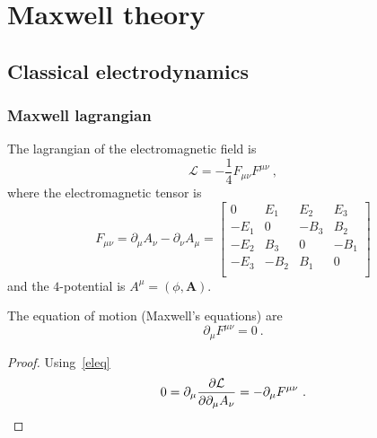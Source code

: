 \part{Maxwell theory}

\chapter{Classical electrodynamics}

\section{Maxwell lagrangian}

    The lagrangian of the electromagnetic field is 
    \begin{equation*}
        \mathcal L = - \frac{1}{4} F_{\mu\nu} F^{\mu\nu} ~,
    \end{equation*}
    where the electromagnetic tensor is 
    \begin{equation*}
        F_{\mu\nu} = \partial_\mu A_\nu - \partial_\nu A_\mu = \begin{bmatrix}
            0 & E_1 & E_2 & E_3 \\ 
            -E_1 & 0 & - B_3 & B_2 \\ 
            - E_2 & B_3 & 0 & - B_1 \\ 
            - E_3 & -B_2 & B_1 & 0 \\
        \end{bmatrix}
    \end{equation*}
    and the $4$-potential is $A^\mu = (\phi, \mathbf A)$.

    The equation of motion (Maxwell's equations) are 
    \begin{equation*}
        \partial_\mu F^{\mu\nu} = 0 ~.
    \end{equation*}
    \begin{proof}
        Using~\eqref{eleq}
        \begin{equation*}
            0 = \partial_\mu \frac{\partial\mathcal L}{\partial\partial_\mu A_\nu} = - \partial_\mu F^{\mu\nu} ~.
        \end{equation*}
    \end{proof}

